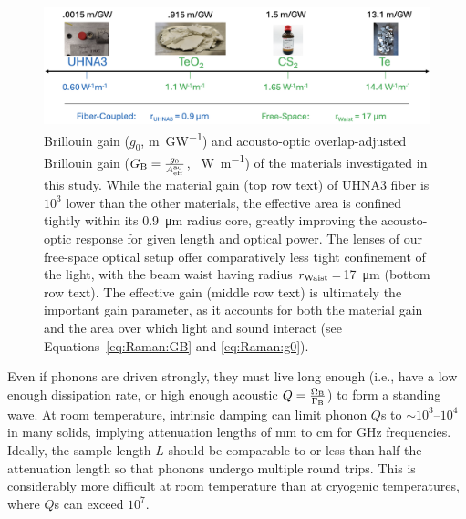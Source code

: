 \begin{figure}[t]
  \centering
  \includegraphics[width=\textwidth]{figs/4-Raman/GainofRelevantMaterials.png}
  \caption[Brillouin gain of investigated materials.]{Brillouin gain (\(g_{0}\), \si{\meter\per\giga\watt}) and acousto-optic overlap-adjusted Brillouin gain (\(G_{\rm B} = \frac{g_{0}}{A_{\rm eff}^{\rm ao}}\), \si{\per\watt\per\meter}) of the materials investigated in this study. While the material gain (top row text) of \ac{UHNA3} fiber is \(10^{3}\) lower than the other materials, the effective area is confined tightly within its \SI{0.9}{\micro\meter} radius core, greatly improving the acousto-optic response for given length and optical power. The lenses of our free-space optical setup offer comparatively less tight confinement of the light, with the beam waist having radius \(r_{\rm Waist}=\)\SI{17}{\micro\meter} (bottom row text). The effective gain (middle row text) is ultimately the important gain parameter, as it accounts for both the material gain and the area over which light and sound interact (see Equations~\ref{eq:Raman:GB} and \ref{eq:Raman:g0}). \cite{boyd2020nonlinear, dubinskii2004teo2, johnson2023laser, behunin2015long, enright1974depolarized, coakley1975brillouin, renninger2018bulk, uchida1969elastic, schweppe1970elastic, ohmachi1972acoustic, peercy1975temperature, fleury2018non, harris1991multichannel, uchida1971optical}}
  \label{fig:Raman:GainofRelevantMaterials}
\end{figure}

Even if phonons are driven strongly, they must live long enough (i.e., have a low enough dissipation rate, or high enough acoustic \(Q = \frac{\Omega_{\rm B}}{\Gamma_{\rm B}}\)) to form a standing wave. At room temperature, intrinsic damping can limit phonon \(Q\)s to \(\sim\)\(10^{3}\)–\(10^{4}\) in many solids, \cite{heiman1979brillouin, bucaro1974high} implying attenuation lengths of \si{\milli\meter} to \si{\centi\meter} for \si{\giga\hertz} frequencies. Ideally, the sample length \(L\) should be comparable to or less than half the attenuation length so that phonons undergo multiple round trips. This is considerably more difficult at room temperature than at cryogenic temperatures, where \(Q\)s can exceed \(10^{7}\). \cite{maris1990phonon, renninger2018bulk}

